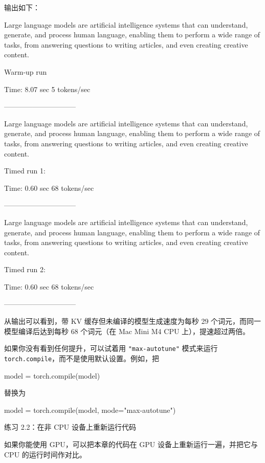 输出如下：

\begin{codebox}
 Large language models are artificial intelligence systems that can
understand, generate, and process human language, enabling them to
perform a wide range of tasks, from answering questions to writing
articles, and even creating creative content.

Warm-up run

Time: 8.07 sec
5 tokens/sec

------------------------------

 Large language models are artificial intelligence systems that can
understand, generate, and process human language, enabling them to
perform a wide range of tasks, from answering questions to writing
articles, and even creating creative content.

Timed run 1:

Time: 0.60 sec
68 tokens/sec

------------------------------

 Large language models are artificial intelligence systems that can
understand, generate, and process human language, enabling them to
perform a wide range of tasks, from answering questions to writing
articles, and even creating creative content.

Timed run 2:

Time: 0.60 sec
68 tokens/sec

------------------------------
\end{codebox}

从输出可以看到，带 KV 缓存但未编译的模型生成速度为每秒 29 个词元，而同一模型编译后达到每秒 68 个词元（在 Mac Mini M4 CPU 上），提速超过两倍。

如果你没有看到任何提升，可以试着用 \texttt{"}\texttt{max-autotune}\texttt{"} 模式来运行 \texttt{torch.compile}，而不是使用默认设置。例如，把

\begin{codebox}
model = torch.compile(model)
\end{codebox}

替换为

\begin{codebox}
model = torch.compile(model, mode="max-autotune")
\end{codebox}

\begin{mySidebar}{练习 2.2：在非 CPU 设备上重新运行代码}

如果你能使用 GPU，可以把本章的代码在 GPU 设备上重新运行一遍，并把它与 CPU 的运行时间作对比。

\end{mySidebar}

